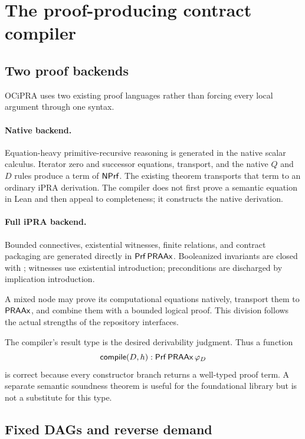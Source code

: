 \section{The proof-producing contract compiler}

\subsection{Two proof backends}

OCiPRA uses two existing proof languages rather than forcing every local argument through one syntax.

\paragraph{Native backend.}
Equation-heavy primitive-recursive reasoning is generated in the native scalar calculus.  Iterator zero and successor equations, transport, and the native \(Q\) and \(D\) rules produce a term of \(\mathsf{NPrf}\).  The existing theorem  transports that term to an ordinary iPRA derivation.  The compiler does not first prove a semantic equation in Lean and then appeal to completeness; it constructs the native derivation.

\paragraph{Full iPRA backend.}
Bounded connectives, existential witnesses, finite relations, and contract packaging are generated directly in \(\mathsf{Prf}\,\mathsf{PRAAx}\).  Booleanized invariants are closed with ; witnesses use existential introduction; preconditions are discharged by implication introduction.

A mixed node may prove its computational equations natively, transport them to \(\mathsf{PRAAx}\), and combine them with a bounded logical proof.  This division follows the actual strengths of the repository interfaces.

\begin{principle}\label{princ:typed}
The compiler's result type is the desired derivability judgment.  Thus a function
\[
  \mathsf{compile}(D,h):\mathsf{Prf}\,\mathsf{PRAAx}\,\varphi_D
\]
is correct because every constructor branch returns a well-typed proof term.  A separate semantic soundness theorem is useful for the foundational library but is not a substitute for this type.
\end{principle}

\subsection{Fixed DAGs and reverse demand}

